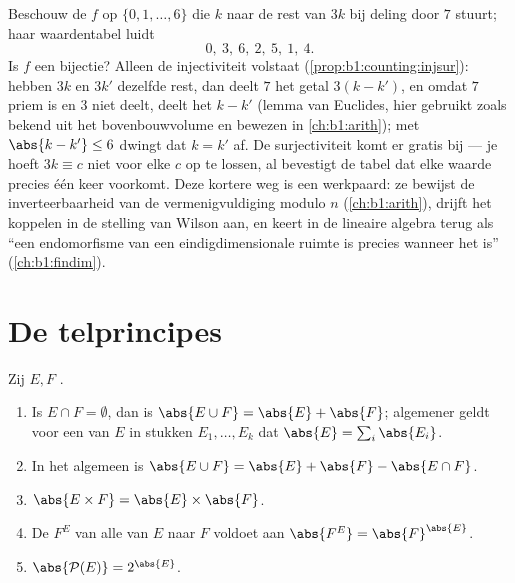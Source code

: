 \begin{example}\label{ex:b1:counting:mod7}
Beschouw de  $f$ op $\{0, 1, \dots, 6\}$ die $k$ naar de
rest van $3k$ bij deling door $7$ stuurt; haar waardentabel luidt
\[
0,\ 3,\ 6,\ 2,\ 5,\ 1,\ 4 .
\]
Is $f$ een bijectie? Alleen de injectiviteit volstaat
(\cref{prop:b1:counting:injsur}): hebben $3k$ en $3k'$ dezelfde
rest, dan deelt $7$ het getal $3(k - k')$, en omdat $7$ priem is en
$3$ niet deelt, deelt het $k - k'$ (lemma van Euclides, hier
gebruikt zoals bekend uit het bovenbouwvolume en bewezen in
\cref{ch:b1:arith}); met $\abs{k - k'} \leq 6$ dwingt dat $k = k'$
af. De surjectiviteit komt er gratis bij --- je hoeft $3k \equiv c$
niet voor elke $c$ op te lossen, al bevestigt de tabel dat elke
waarde precies één keer voorkomt. Deze kortere weg is een werkpaard:
ze bewijst de inverteerbaarheid van de vermenigvuldiging modulo $n$
(\cref{ch:b1:arith}), drijft het koppelen in de stelling van Wilson
aan, en keert in de lineaire algebra terug als ``een endomorfisme
van een eindigdimensionale ruimte is  precies wanneer het
 is'' (\cref{ch:b1:findim}).
\end{example}

\section{De telprincipes}

\begin{proposition}\label{prop:b1:counting:rules}
Zij $E, F$ .
\begin{enumerate}
  \item Is $E \cap F = \emptyset$, dan is $\abs{E \cup F} = \abs{E} +
        \abs{F}$; algemener geldt voor een  van $E$ in stukken
        $E_1, \dots, E_k$ dat $\abs{E} = \sum_i \abs{E_i}$.
  \item In het algemeen is $\abs{E \cup F} = \abs{E} + \abs{F} - \abs{E
        \cap F}$.
  \item $\abs{E \times F} = \abs{E} \times \abs{F}$.
  \item De  $F^E$ van alle  van $E$ naar $F$
        voldoet aan $\abs{F^E} = \abs{F}^{\abs{E}}$.
  \item $\abs{\mathcal{P}(E)} = 2^{\abs{E}}$.
\end{enumerate}
\end{proposition}


